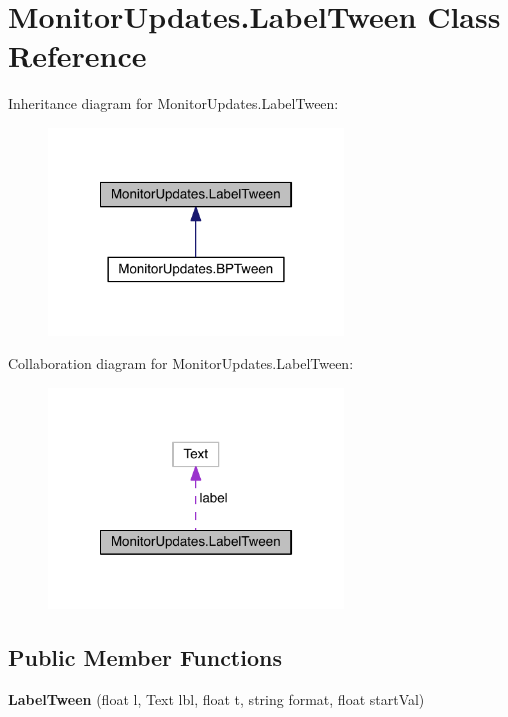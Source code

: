 \hypertarget{class_monitor_updates_1_1_label_tween}{}\section{Monitor\+Updates.\+Label\+Tween Class Reference}
\label{class_monitor_updates_1_1_label_tween}


Inheritance diagram for Monitor\+Updates.\+Label\+Tween\+:\nopagebreak
\begin{figure}[H]
\begin{center}
\leavevmode
\includegraphics[width=222pt]{class_monitor_updates_1_1_label_tween__inherit__graph}
\end{center}
\end{figure}


Collaboration diagram for Monitor\+Updates.\+Label\+Tween\+:\nopagebreak
\begin{figure}[H]
\begin{center}
\leavevmode
\includegraphics[width=222pt]{class_monitor_updates_1_1_label_tween__coll__graph}
\end{center}
\end{figure}
\subsection*{Public Member Functions}
\begin{DoxyCompactItemize}
\item 
{\bfseries Label\+Tween} (float l, Text lbl, float t, string format, float start\+Val)\hypertarget{class_monitor_updates_1_1_label_tween_a4a4285a3c3cefeed0e153f4929592554}{}\label{class_monitor_updates_1_1_label_tween_a4a4285a3c3cefeed0e153f4929592554}

\end{DoxyCompactItemize}
